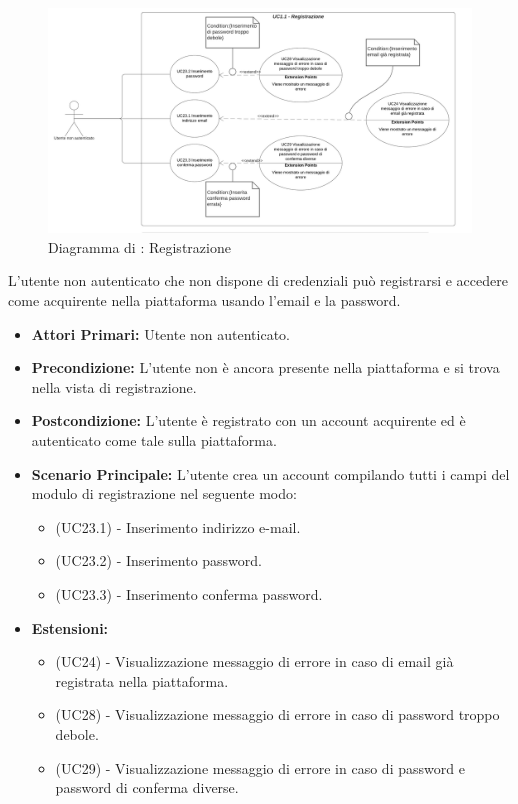 
\begin{figure}[H]
    \centering
    \includegraphics[scale=0.6]{Immagini/DiagrammiUC/UC1.1Registrazione}
    \caption{Diagramma di \actualUC: Registrazione}
    \label{fig:Registrazione}
\end{figure}

L'utente non autenticato che non dispone di credenziali può registrarsi e accedere come acquirente nella piattaforma usando l'email e la password.
\begin{itemize}
    \item \textbf{Attori Primari:} Utente non autenticato.
    \item \textbf{Precondizione:} L'utente non è ancora presente nella piattaforma e si trova nella vista di registrazione.
    \item \textbf{Postcondizione:} L'utente è registrato con un account acquirente ed è autenticato come tale sulla piattaforma.
    \item \textbf{Scenario Principale:} L'utente crea un account compilando tutti i campi del modulo di registrazione nel seguente modo:
    \begin{itemize}
        \item (UC23.1) - Inserimento indirizzo e-mail.
        \item (UC23.2) - Inserimento password.
        \item (UC23.3) - Inserimento conferma password.
    \end{itemize}
    \item \textbf{Estensioni:}
    \begin{itemize}
        \item (UC24) - Visualizzazione messaggio di errore in caso di email già registrata nella piattaforma.
        \item (UC28) - Visualizzazione messaggio di errore in caso di password troppo debole. 
        \item (UC29) - Visualizzazione messaggio di errore in caso di password e password di conferma diverse. 
    \end{itemize}
\end{itemize}

